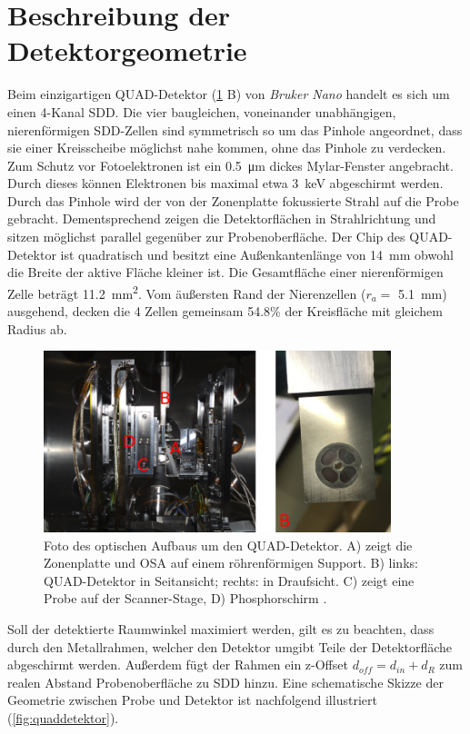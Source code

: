 \section{Beschreibung der Detektorgeometrie}
Beim einzigartigen QUAD-Detektor (\cref{fig:aufbau_foto} B) von \textit{Bruker Nano} handelt es sich um einen 4-Kanal SDD. Die vier baugleichen, voneinander unabhängigen, nierenförmigen SDD-Zellen sind symmetrisch so um das Pinhole angeordnet, dass sie einer Kreisscheibe möglichst nahe kommen, ohne das Pinhole zu verdecken. Zum Schutz vor Fotoelektronen ist ein \SI{0.5}{\micro\meter} dickes Mylar-Fenster  angebracht. Durch dieses können Elektronen bis maximal etwa \SI{3}{\kilo\electronvolt} abgeschirmt werden. Durch das Pinhole wird der von der Zonenplatte fokussierte Strahl auf die Probe gebracht. Dementsprechend zeigen die Detektorflächen in Strahlrichtung und sitzen möglichst parallel gegenüber zur Probenoberfläche. Der Chip des QUAD-Detektor ist quadratisch und besitzt eine Außenkantenlänge von \SI{14}{\milli\meter} obwohl die Breite der aktive Fläche kleiner ist. Die Gesamtfläche einer nierenförmigen Zelle beträgt \SI{11.2}{\square\milli\meter}. Vom äußersten Rand der Nierenzellen ($r_a=$ \SI{5.1}{\milli\meter}) ausgehend, decken die 4 Zellen gemeinsam 54.8\% der Kreisfläche mit gleichem Radius ab.
\begin{figure}[H]
  \centering
     \includegraphics[width=0.9\textwidth]{illustrations/aufbau-foto_hanna.png}
  \caption[Foto der Optiken und des QUAD-Detektor]{Foto des optischen Aufbaus um den QUAD-Detektor. A) zeigt die Zonenplatte und OSA auf einem röhrenförmigen Support. B) links: QUAD-Detektor in Seitansicht; rechts: in Draufsicht. C) zeigt eine Probe auf der Scanner-Stage, D) Phosphorschirm \cite[S.~41]{hanna}.}
  \label{fig:aufbau_foto}
\end{figure}
Soll der detektierte Raumwinkel maximiert werden, gilt es zu beachten, dass durch den Metallrahmen, welcher den Detektor umgibt Teile der Detektorfläche abgeschirmt werden. Außerdem fügt der Rahmen ein z-Offset $d_{off} = d_{in} + d_{R}$ zum realen Abstand Probenoberfläche zu SDD hinzu. Eine schematische Skizze der Geometrie zwischen Probe und Detektor ist nachfolgend illustriert (\cref{fig:quaddetektor}).
